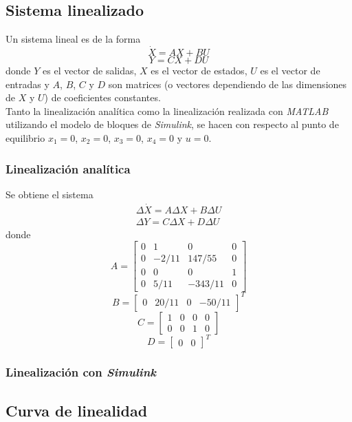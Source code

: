 \documentclass{ieeeaccess}
\begin{document}
\subsection{Sistema linealizado}
Un sistema lineal es de la forma
\[\dot{X}=AX+BU\]
\[Y=CX+DU\]
donde $Y$ es el vector de salidas, $X$ es el vector de estados, $U$ es el vector
de entradas y $A$, $B$, $C$ y $D$ son matrices (o vectores dependiendo de las
dimensiones de $X$ y $U$) de coeficientes constantes.\\

Tanto la linealización analítica como la linealización realizada con
\textit{MATLAB} utilizando el modelo de bloques de \textit{Simulink},
se hacen con respecto al punto de equilibrio $x_1=0$, $x_2=0$, $x_3=0$, $x_4=0$
y $u=0$.

\subsubsection{Linealización analítica}
Se obtiene el sistema
\begin{eqnarray}
\Delta\dot{X} = A\Delta X + B\Delta U\\
\Delta Y = C\Delta X + D\Delta U
\end{eqnarray}
donde
\[A = \begin{bmatrix}
    0 & 1 & 0 & 0\\
    0 & -2/11 & 147/55 & 0\\
    0 & 0 & 0 & 1\\
    0 & 5/11 & -343/11 & 0
\end{bmatrix}\]
\[B = \begin{bmatrix}
    0 &
    20/11 &
    0 &
    -50/11
\end{bmatrix}^{T}\]
\[C = \begin{bmatrix}
    1 & 0 & 0 & 0\\
    0 & 0 & 1 & 0
\end{bmatrix}\]
\[D = \begin{bmatrix}
    0&
    0
\end{bmatrix}^{T}\]
\subsubsection{Linealización con \textit{Simulink}}
\subsection{Curva de linealidad}
\EOD{}
\end{document}
